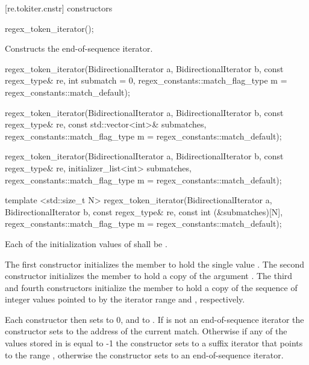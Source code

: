 [re.tokiter.cnstr]{ constructors}

%
\begin{itemdecl}
regex_token_iterator(); 
\end{itemdecl}

\begin{itemdescr}
\pnum
\effects  Constructs the end-of-sequence iterator.
\end{itemdescr}

%
\begin{itemdecl}
regex_token_iterator(BidirectionalIterator a, BidirectionalIterator b, 
                    const regex_type& re, 
                    int submatch = 0, 
                    regex_constants::match_flag_type m =
                     regex_constants::match_default); 

regex_token_iterator(BidirectionalIterator a, BidirectionalIterator b, 
                    const regex_type& re, 
                    const std::vector<int>& submatches, 
                    regex_constants::match_flag_type m =
                     regex_constants::match_default); 

regex_token_iterator(BidirectionalIterator a, BidirectionalIterator b,
                    const regex_type& re, 
                    initializer_list<int> submatches,
                    regex_constants::match_flag_type m =
                      regex_constants::match_default);

template <std::size_t N>
  regex_token_iterator(BidirectionalIterator a, BidirectionalIterator b, 
                    const regex_type& re, 
                    const int (&submatches)[N],
                    regex_constants::match_flag_type m =
                     regex_constants::match_default); 
\end{itemdecl}

\begin{itemdescr}
\pnum
\requires Each of the initialization values of  shall be .

\pnum
\effects The first constructor initializes the member  to hold the single
value . The second constructor initializes the member  to
hold a copy of the argument . The third and fourth constructors
initialize the member  to hold a copy of the sequence of integer values
pointed to by the iterator range  and
, respectively.

\pnum
Each constructor then sets  to 0, and  to
. If  is not an
end-of-sequence iterator the constructor sets  to the
address of the current match. Otherwise if any of the values stored
in  is equal to -1 the constructor sets  to a suffix
iterator that points to the range , otherwise the constructor
sets  to an end-of-sequence iterator.
\end{itemdescr}


